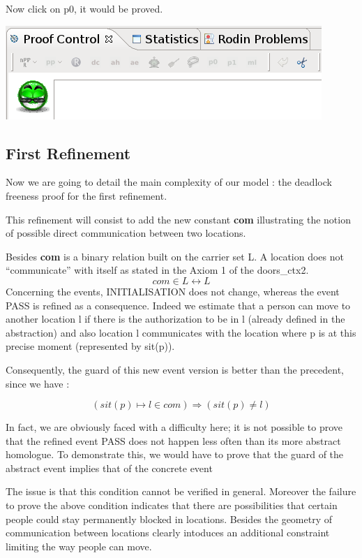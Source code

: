 Now click on p0, it would be proved.

\begin{center}
	\includegraphics[]{img/tutorial/tut_10_proved.png}
\end{center}

\subsection{First Refinement}

Now we are going to detail the main complexity of our model : the deadlock freeness proof for the first refinement. 

This refinement will consist to add the new constant \textbf{com} illustrating the notion of possible direct communication between two locations.

Besides \textbf{com} is a binary relation built on the carrier set L. A location does not “communicate” with itself as stated in the Axiom 1 of the doors\_ctx2.
\[
com \in L\leftrightarrow L
\]
Concerning the events, \textsf{INITIALISATION} does not change, whereas the event \textsf{PASS} is refined as a consequence. Indeed we estimate that a person can move to another location l if there is the authorization to be in l (already defined in the abstraction) and also location l communicates with the location where p is at this precise moment (represented by sit(p)).

Consequently, the guard of this new event version is better than the precedent, since we have :

\[
( sit(p) \mapsto l \in com ) \Rightarrow ( sit(p)\neq l )
\]

In fact, we are obviously faced with a difficulty here; it is not possible to prove that the refined event \textsf{PASS} does not happen less often than its more abstract homologue. To demonstrate this, we would have to prove that the guard of the abstract event implies that of the concrete event

The issue is that this condition cannot be verified in general. Moreover the failure to prove the above condition indicates that there are possibilities that certain people could stay permanently blocked in locations. Besides the geometry of communication between locations clearly intoduces an additional constraint limiting the way people can move.

